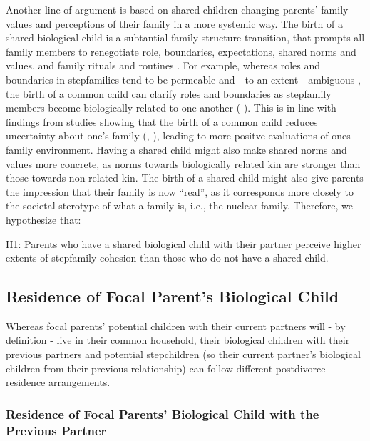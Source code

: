 \documentclass[\pandocDocMode,longtable,floatsintext]{apa6}
\begin{document}
Another line of argument is based on shared children changing parents'
family values and perceptions of their family in a more systemic way.
The birth of a shared biological child is a subtantial family structure
transition, that prompts all family members to renegotiate role,
boundaries, expectations, shared norms and values, and family rituals
and routines \autocite{coleman2013resilience}. For example, whereas
roles and boundaries in stepfamilies tend to be permeable and - to an
extent - ambiguous \autocite{fine1992perceived}, the birth of a common
child can clarify roles and boundaries as stepfamily members become
biologically related to one another (\autocite{anderson1999sibling}
\autocite{pasley1989boundary}). This is in line with findings from
studies showing that the birth of a common child reduces uncertainty
about one's family (\autocite{downs2004family},
\autocite{friedman1994theory}), leading to more positve evaluations of
ones family environment. Having a shared child might also make shared
norms and values more concrete, as norms towards biologically related
kin are stronger than those towards non-related kin. The birth of a
shared child might also give parents the impression that their family is
now ``real'', as it corresponds more closely to the societal sterotype
of what a family is, i.e., the nuclear family. Therefore, we hypothesize
that:

H1: Parents who have a shared biological child with their partner
perceive higher extents of stepfamily cohesion than those who do not
have a shared child.

\hypertarget{residence-of-focal-parents-biological-child}{%
\subsection{Residence of Focal Parent's Biological
Child}\label{residence-of-focal-parents-biological-child}}

Whereas focal parents' potential children with their current partners
will - by definition - live in their common household, their biological
children with their previous partners and potential stepchildren (so
their current partner's biological children from their previous
relationship) can follow different postdivorce residence arrangements.

\hypertarget{residence-of-focal-parents-biological-child-with-the-previous-partner}{%
\subsubsection{Residence of Focal Parents' Biological Child with the
Previous
Partner}\label{residence-of-focal-parents-biological-child-with-the-previous-partner}}
\end{document}
